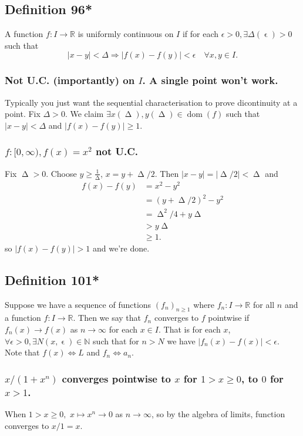 \documentclass{article}
\DeclareMathOperator\dom{dom}
\DeclareMathOperator\eps{\epsilon}
\DeclareMathOperator\Del{\Delta}
\begin{document}
\subsection{Definition 96*}
A function $f:I \to \mathbb{R}$ is uniformly continuous on $I$ if for each
$\epsilon>0, \exists \Delta(\eps)>0$ such that \[
|x-y|<\Delta \Longrightarrow |f(x)-f(y)|<\epsilon \quad \forall x, y\in I.
\]
\subsubsection*{Not U.C. (importantly) on $I$. A single point won't work.}
Typically you just want the sequential characterisation to prove dicontinuity at a point. Fix $\Delta>0$. We claim
$\exists x(\Del),y(\Del) \in \dom(f)$ such that $|x-y|<\Delta$ and $|f(x)-f(y)| \geq 1$.
\subsubsection*{$f:[0,\infty), f(x) = x^2$ not U.C.}
Fix $\Del>0$. Choose $y \geq \frac{1}{\Del}$, $x = y+\Del \slash 2$. Then $|x-y| = |\Del \slash 2|<\Del$ and
\begin{align*}
f(x)-f(y) &= x^2-y^2 \\
&= (y+\Del \slash 2)^2-y^2 \\
&= \Del^2 \slash 4 + y\Del \\
&> y\Del \\
&\geq 1.
\end{align*}
so $|f(x)-f(y)|>1$ and we're done.
\newpage{}
\subsection{Definition 101*}
Suppose we have a sequence of functions $(f_n)_{n\geq 1}$ where
$f_n:I \to \mathbb{R}$ for all $n$ and a function $f:I \to \mathbb{R}$.
Then we say that $f_n$ converges to $f$ pointwise if $f_n(x) \to f(x)$ as $n \to \infty$
for each $x \in I$. That is for each $x$, $\forall \epsilon > 0, \exists N(x, \eps) \in \mathbb{N}$ such that
for $n>N$ we have $|f_n(x)-f(x)|<\epsilon$. \\
\newline
Note that $f(x) \Longleftrightarrow L$ and $f_n \Longleftrightarrow a_n$.
\subsubsection*{$x \slash (1+x^n)$ converges pointwise to $x$ for $1 > x \geq 0$, to $0$ for $x>1$.}
When $1>x \geq 0,$ $x \mapsto x^n \to 0$ as $n \to \infty$, so by the algebra of limits,
function converges to $x \slash 1 = x$.
\end{document}
